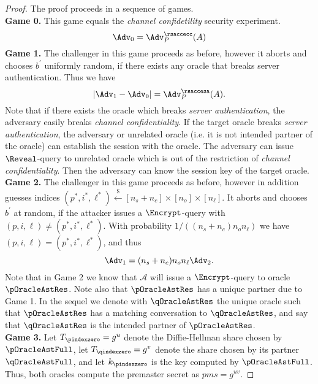 \begin{proof}
 The proof proceeds in a sequence of games. \vspace{10pt}\\
 \textbf{Game 0.} This game equals the \textit{channel confidetility} security experiment.
 \begin{equation}
  \Adv_0 = \Adv^{\rsaccecc}_{P}(A)
 \end{equation}%
%
%
 \textbf{Game 1.} The challenger in this game proceeds as before, however it aborts and chooses $b^{\prime}$ uniformly random, if there exists any oracle that breaks server authentication. Thus we have
 \begin{equation}
  |\Adv_1 - \Adv_0| = \Adv^{\rsaccesa}_{P}(A).
 \end{equation}%
 Note that if there exists the oracle which breaks \textit{server authentication}, the adversary easily breaks \textit{channel confidentiality}. If the target oracle breaks \textit{server authentication}, the adversary or unrelated oracle (i.e. it is not intended partner of the oracle) can establish the session with the oracle. The adversary can issue $\Reveal$-query to unrelated oracle which is out of the restriction of \textit{channel confidentiality}. Then the adversary can know the session key of the target oracle.
\vspace{10pt}\\%
%
%
 \textbf{Game 2.} The challenger in this game proceeds as before, however in addition guesses indices $(p^{\ast}, i^{\ast}, \ell^{\ast}) \xleftarrow{\$} [n_s + n_c] \times [n_o] \times [n_{\ell}]$. It aborts and chooses $b^{\prime}$ at random, if the attacker issues a $\Encrypt$-query with $(p,i,\ell) \neq (p^{\ast}, i^{\ast}, \ell^{\ast})$. With probability $1/((n_s+n_c)n_o n_{\ell})$ we have $(p,i,\ell) = (p^{\ast}, i^{\ast}, \ell^{\ast})$, and thus
 \begin{equation}
  \Adv_1 = (n_s + n_c) n_o n_{\ell}\Adv_2.
 \end{equation}%
 Note that in Game 2 we know that $\mathcal{A}$ will issue a $\Encrypt$-query to oracle $\pOracleAstRes$. Note also that $\pOracleAstRes$ has a unique partner due to Game 1. In the sequel we denote with $\qOracleAstRes$ the unique oracle such that $\pOracleAstRes$ has a matching conversation to $\qOracleAstRes$, and say that $\qOracleAstRes$ is the intended partner of $\pOracleAstRes$.
\vspace{10pt}\\%
%
%
 \textbf{Game 3.} Let $T_{\pindexzero} = g^u$ denote the Diffie-Hellman share chosen by $\pOracleAstFull$, let $T_{\qindexzero} = g^v$ denote the share chosen by its partner $\qOracleAstFull$, and let $k_{\pindexzero}$ is the key computed by $\pOracleAstFull$. Thus, both oracles compute the premaster secret as $pms = g^{uv}$.


\end{proof}
